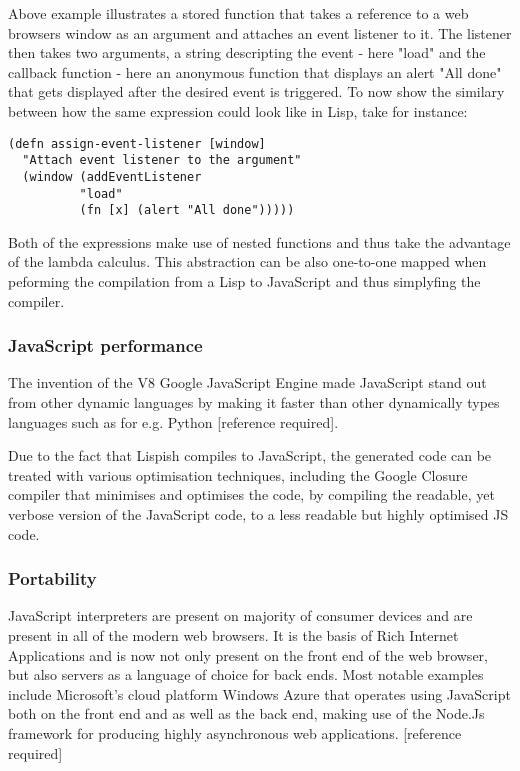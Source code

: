 Above example illustrates a stored function that takes a reference to a web browsers window as an argument and attaches an event listener to it. The listener then takes two arguments, a string descripting the event - here "load" and the callback function - here an anonymous function that displays an alert "All done" that gets displayed after the desired event is triggered.
To now show the similary between how the same expression could look like in Lisp, take for instance:

\begin{lstlisting}
(defn assign-event-listener [window]
  "Attach event listener to the argument"
  (window (addEventListener 
  	   	  "load" 
		  (fn [x] (alert "All done")))))
\end{lstlisting}

Both of the expressions make use of nested functions and thus take the advantage of the lambda calculus. This abstraction can be also one-to-one mapped when peforming the compilation from a Lisp to JavaScript and thus simplyfing the compiler.

\subsubsection{JavaScript performance}
The invention of the V8 Google JavaScript Engine made JavaScript stand out from other dynamic languages by making it faster than other dynamically types languages such as for e.g. Python [reference required].

Due to the fact that Lispish compiles to JavaScript, the generated code can be treated with various optimisation techniques, including the Google Closure compiler that minimises and optimises the code, by compiling the readable, yet verbose version of the JavaScript code, to a less readable but highly optimised JS code. 

\subsubsection{Portability}
JavaScript interpreters are present on majority of consumer devices and are present in all of the modern web browsers. It is the basis of Rich Internet Applications and is now not only present on the front end of the web browser, but also servers as a language of choice for back ends.
Most notable examples include Microsoft's cloud platform Windows Azure that operates using JavaScript both on the front end and as well as the back end, making use of the Node.Js framework for producing highly asynchronous web applications. [reference required]

